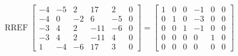 \begin{exerciseAnswer} 


\[\operatorname{RREF} \left[\begin{array}{ccccc|c}
-4 & -5 & 2 & 17 & 2 & 0 \\
-4 & 0 & -2 & 6 & -5 & 0 \\
-3 & 4 & 2 & -11 & -6 & 0 \\
-3 & 4 & 2 & -11 & 4 & 0 \\
1 & -4 & -6 & 17 & 3 & 0
\end{array}\right] = \left[\begin{array}{ccccc|c}
1 & 0 & 0 & -1 & 0 & 0 \\
0 & 1 & 0 & -3 & 0 & 0 \\
0 & 0 & 1 & -1 & 0 & 0 \\
0 & 0 & 0 & 0 & 1 & 0 \\
0 & 0 & 0 & 0 & 0 & 0
\end{array}\right] \]



\end{exerciseAnswer}
